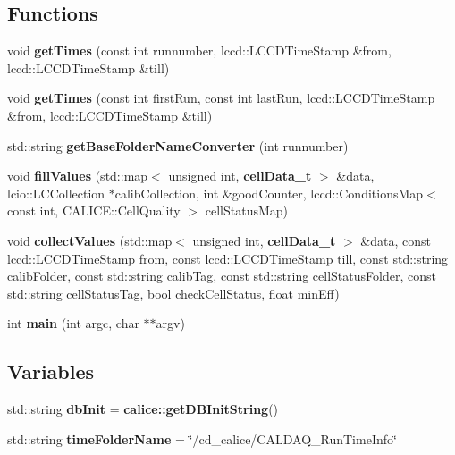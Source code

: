 \subsection*{Functions}
\begin{DoxyCompactItemize}
\item 
void {\bfseries get\-Times} (const int runnumber, lccd\-::\-L\-C\-C\-D\-Time\-Stamp \&from, lccd\-::\-L\-C\-C\-D\-Time\-Stamp \&till)\label{extractCalibEfficiency_8cc_ab982c6e6c33d5f342251e84aa6afe24d}

\item 
void {\bfseries get\-Times} (const int first\-Run, const int last\-Run, lccd\-::\-L\-C\-C\-D\-Time\-Stamp \&from, lccd\-::\-L\-C\-C\-D\-Time\-Stamp \&till)\label{extractCalibEfficiency_8cc_a8a70681e88230b73098cc62aaa0b5316}

\item 
std\-::string {\bfseries get\-Base\-Folder\-Name\-Converter} (int runnumber)\label{extractCalibEfficiency_8cc_acf725fcd1fd444965590d7182b1fafc8}

\item 
void {\bfseries fill\-Values} (std\-::map$<$ unsigned int, {\bf cell\-Data\-\_\-t} $>$ \&data, lcio\-::\-L\-C\-Collection $\ast$calib\-Collection, int \&good\-Counter, lccd\-::\-Conditions\-Map$<$ const int, C\-A\-L\-I\-C\-E\-::\-Cell\-Quality $>$ cell\-Status\-Map)\label{extractCalibEfficiency_8cc_a1c6822344a9c3addc2c587a5a9fbcc0a}

\item 
void {\bfseries collect\-Values} (std\-::map$<$ unsigned int, {\bf cell\-Data\-\_\-t} $>$ \&data, const lccd\-::\-L\-C\-C\-D\-Time\-Stamp from, const lccd\-::\-L\-C\-C\-D\-Time\-Stamp till, const std\-::string calib\-Folder, const std\-::string calib\-Tag, const std\-::string cell\-Status\-Folder, const std\-::string cell\-Status\-Tag, bool check\-Cell\-Status, float min\-Eff)\label{extractCalibEfficiency_8cc_a101535bfac3453d0fdaab5e9a3589af4}

\item 
int {\bfseries main} (int argc, char $\ast$$\ast$argv)\label{extractCalibEfficiency_8cc_a3c04138a5bfe5d72780bb7e82a18e627}

\end{DoxyCompactItemize}
\subsection*{Variables}
\begin{DoxyCompactItemize}
\item 
std\-::string {\bfseries db\-Init} = {\bf calice\-::get\-D\-B\-Init\-String}()\label{extractCalibEfficiency_8cc_a6b6249ff0366b8a48c34dfbbf6c6fbec}

\item 
std\-::string {\bfseries time\-Folder\-Name} = \char`\"{}/cd\-\_\-calice/C\-A\-L\-D\-A\-Q\-\_\-\-Run\-Time\-Info\char`\"{}\label{extractCalibEfficiency_8cc_a4d2cd635f803f7649a78988cdd8b70b9}

\end{DoxyCompactItemize}


